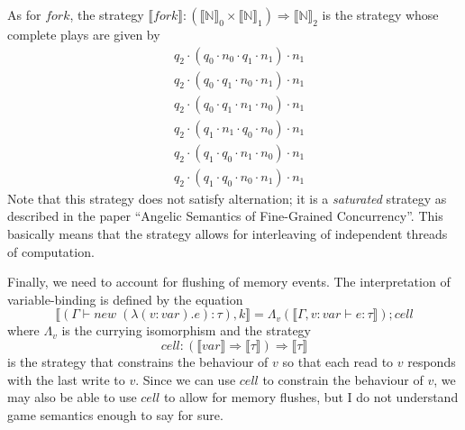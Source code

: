 \documentclass{article}
\begin{document}
As for $fork$, the strategy $\llbracket fork \rrbracket : (\llbracket \mathbb{N}
\rrbracket_0 \times \llbracket \mathbb{N} \rrbracket_1) \Rightarrow
\llbracket \mathbb{N} \rrbracket_2$ is the strategy whose complete plays are
given by
\begin{align*}
&q_2 \cdot (q_0 \cdot n_0 \cdot q_1 \cdot n_1) \cdot n_1\\
&q_2 \cdot (q_0 \cdot q_1 \cdot n_0 \cdot n_1) \cdot n_1\\
&q_2 \cdot (q_0 \cdot q_1 \cdot n_1 \cdot n_0) \cdot n_1\\
&q_2 \cdot (q_1 \cdot n_1 \cdot q_0 \cdot n_0) \cdot n_1\\
&q_2 \cdot (q_1 \cdot q_0 \cdot n_1 \cdot n_0) \cdot n_1\\
&q_2 \cdot (q_1 \cdot q_0 \cdot n_0 \cdot n_1) \cdot n_1
\end{align*}
Note that this strategy does not satisfy alternation; it is a \textit{saturated}
strategy as described in the paper ``Angelic Semantics of Fine-Grained
Concurrency''. This basically means that the strategy allows for interleaving of
independent threads of computation.

Finally, we need to account for flushing of memory events. The
interpretation of variable-binding is defined by the equation
$$\llbracket (\Gamma \vdash new \; (\lambda (v : var).e) : \tau), k \rrbracket = 
\Lambda_v(\llbracket \Gamma, v : var \vdash e : \tau \rrbracket); cell$$ where
$\Lambda_v$ is the currying isomorphism and the strategy $$cell : (\llbracket
var \rrbracket \Rightarrow \llbracket \tau \rrbracket) \Rightarrow \llbracket
\tau \rrbracket$$ is the strategy that constrains the behaviour of $v$ so that
each read to $v$ responds with the last write to $v$. Since we can use $cell$ to
constrain the behaviour of $v$, we may also be able to use $cell$ to
allow for memory flushes, but I do not understand game semantics enough to say
for sure.
\end{document}
